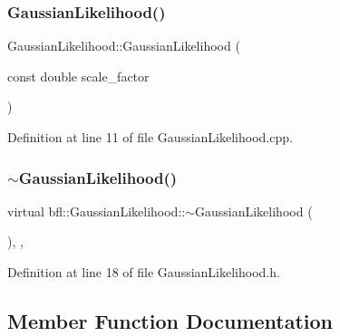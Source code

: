 \subsubsection{\texorpdfstring{Gaussian\+Likelihood()}{GaussianLikelihood()}\hspace{0.1cm}{\footnotesize\ttfamily [2/2]}}
{\footnotesize\ttfamily Gaussian\+Likelihood\+::\+Gaussian\+Likelihood (\begin{DoxyParamCaption}\item[{const double}]{scale\+\_\+factor }\end{DoxyParamCaption})\hspace{0.3cm}{\ttfamily [noexcept]}}



Definition at line 11 of file Gaussian\+Likelihood.\+cpp.

\mbox{\label{classbfl_1_1GaussianLikelihood_a8d48eeeac83a3ac1a5e48913fdffa0d4}} 
\subsubsection{\texorpdfstring{$\sim$\+Gaussian\+Likelihood()}{~GaussianLikelihood()}}
{\footnotesize\ttfamily virtual bfl\+::\+Gaussian\+Likelihood\+::$\sim$\+Gaussian\+Likelihood (\begin{DoxyParamCaption}{ }\end{DoxyParamCaption})\hspace{0.3cm}{\ttfamily [inline]}, {\ttfamily [virtual]}, {\ttfamily [noexcept]}}



Definition at line 18 of file Gaussian\+Likelihood.\+h.



\subsection{Member Function Documentation}
\mbox{\label{classbfl_1_1GaussianLikelihood_a07bbe94864e1cf4ccb2232e51673575a}} 
